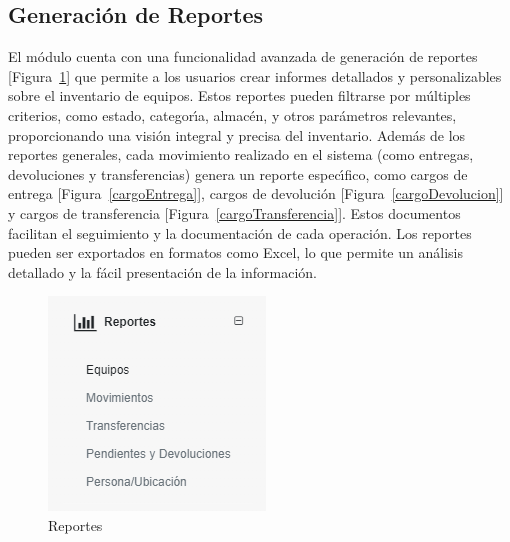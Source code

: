 \documentclass[stu, 12pt, letterpaper, donotrepeattitle, floatsintext, natbib]{apa7}
\begin{document}
\subsection{Generaci\'on de Reportes}
El m\'odulo cuenta con una funcionalidad avanzada de generaci\'on de reportes [Figura~\ref{reportes}] que permite a los usuarios crear informes detallados y personalizables sobre el inventario de equipos. Estos reportes pueden filtrarse por m\'ultiples criterios, como estado, categor\'{\i}a, almac\'en, y otros par\'ametros relevantes, proporcionando una visi\'on integral y precisa del inventario. Adem\'as de los reportes generales, cada movimiento realizado en el sistema (como entregas, devoluciones y transferencias) genera un reporte espec\'{\i}fico, como cargos de entrega [Figura~\ref{cargoEntrega}], cargos de devoluci\'on [Figura~\ref{cargoDevolucion}] y cargos de transferencia [Figura~\ref{cargoTransferencia}]. Estos documentos facilitan el seguimiento y la documentaci\'on de cada operaci\'on. Los reportes pueden ser exportados en formatos como Excel, lo que permite un an\'alisis detallado y la f\'acil presentaci\'on de la informaci\'on.
\begin{figure}[H]
    \centering
    \caption{Reportes}\label{reportes}
    \includegraphics[scale=1]{./images/reportes.png}
\end{figure}
\end{document}
